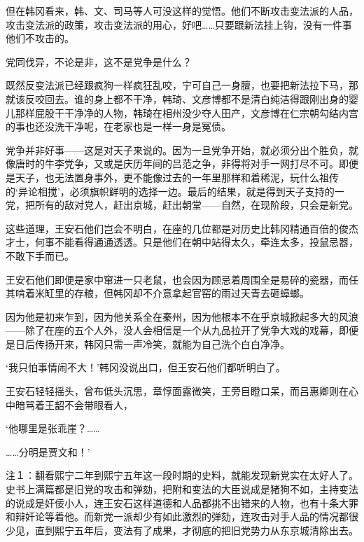 但在韩冈看来，韩、文、司马等人可没这样的觉悟。他们不断攻击变法派的人品，攻击变法派的政策，攻击变法派的用心，好吧……只要跟新法挂上钩，没有一件事他们不攻击的。

党同伐异，不论是非，这不是党争是什么？

既然反变法派已经跟疯狗一样疯狂乱咬，宁可自己一身膻，也要把新法拉下马，那就该反咬回去。谁的身上都不干净，韩琦、文彦博都不是清白纯洁得跟刚出身的婴儿那样屁股干干净净的人物，韩琦在相州没少夺人田产，文彦博在仁宗朝勾结内宫的事也还没洗干净呢，在老家也是一样一身是冤债。

党争并非好事——这是对天子来说的。因为一旦党争开始，就必须分出个胜负，就像唐时的牛李党争，又或是庆历年间的吕范之争，非得将对手一网打尽不可。即便是天子，也无法置身事外，更不能像过去的一年里那样和着稀泥，玩什么祖传的‘异论相搅’，必须旗帜鲜明的选择一边。最后的结果，就是得到天子支持的一党，把所有的敌对党人，赶出京城，赶出朝堂——自然，在现阶段，只会是新党。

这些道理，王安石他们岂会不明白，在座的几位都是对历史比韩冈精通百倍的俊杰才士，何事不能看得通通透透。只是他们在朝中站得太久，牵连太多，投鼠忌器，不敢下手而已。

王安石他们即便是家中窜进一只老鼠，也会因为顾忌着周围全是易碎的瓷器，而任其啃着米缸里的存粮，但韩冈却不介意拿起官窑的雨过天青去砸蟑螂。

因为他是初来乍到，因为他关系全在秦州，因为他根本不在乎京城掀起多大的风浪——除了在座的五个人外，没人会相信是一个从九品拉开了党争大戏的戏幕，即便是日后传扬开来，韩冈只需一声冷笑，就能为自己洗个白白净净。

‘我只怕事情闹不大！’韩冈没说出口，但王安石他们都听明白了。

王安石轻轻摇头，曾布低头沉思，章惇面露微笑，王旁目瞪口呆，而吕惠卿则在心中暗骂着王韶不会带眼看人，

‘他哪里是张乖崖？……

……分明是贾文和！’

注１：翻看熙宁二年到熙宁五年这一段时期的史料，就能发现新党实在太好人了。史书上满篇都是旧党的攻击和弹劾，把附和变法的大臣说成是猪狗不如，主持变法的说成是奸佞小人，连王安石这样道德和人品都挑不出错来的人物，也有十条大罪和辩奸论等着他。而新党一派却少有如此激烈的弹劾，连攻击对手人品的情况都很少见，直到熙宁五年后，变法有了成果，才彻底的把旧党势力从东京城清除出去。

